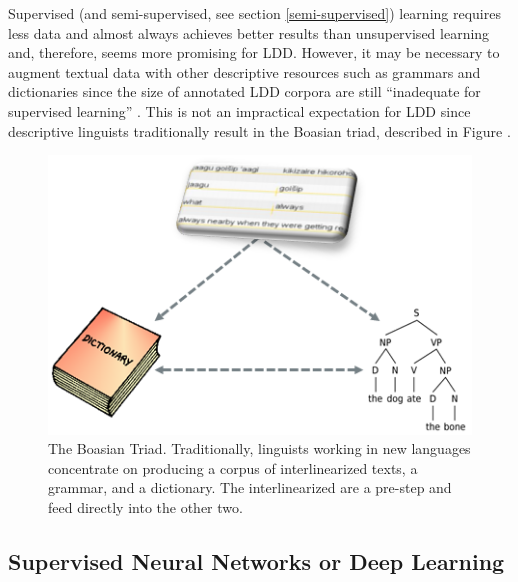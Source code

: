 \documentclass[12pt]{article}
\begin{document}
Supervised (and semi-supervised, see section \ref{semi-supervised}) learning requires less data and almost always achieves better results than unsupervised learning \cite{ruokolainen_supervised_2013} and, therefore, seems more promising for LDD. However, it may be necessary to augment textual data with other descriptive resources such as grammars and dictionaries since the size of annotated LDD corpora are still ``inadequate for supervised learning'' \cite[page 18]{duong_natural_2017}. This is not an impractical expectation for LDD since descriptive linguists traditionally result in the Boasian triad, described in Figure .

\begin{figure}[ht]
\label{fig:Triad}
\begin{center}
\includegraphics[width=0.7\columnwidth]{Triad.PNG}
\caption{The Boasian Triad. Traditionally, linguists working in new languages concentrate on producing a corpus of interlinearized texts, a grammar, and a dictionary. The interlinearized are a pre-step and feed directly into the other two.}
\end{center}
\end{figure}

\subsection{Supervised Neural Networks or Deep Learning}
\end{document}
